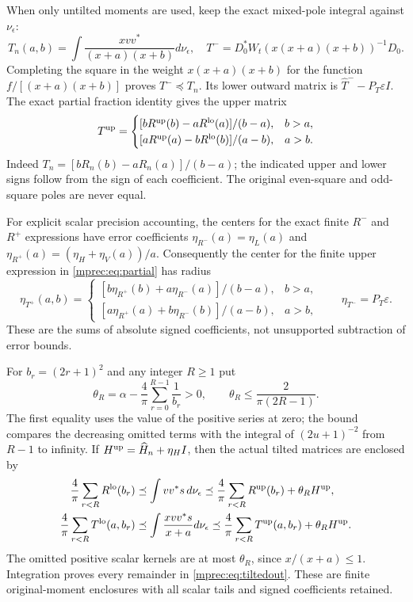 \documentclass[11pt]{article}
\begin{document}
When only untilted moments are used, keep the exact mixed-pole
integral against $\nu_\epsilon$:
\[
 T_n(a,b)=\int\frac{xvv^*}{(x+a)(x+b)}d\nu_\epsilon,
 \quad T^- =D_0^*W_t(x(x+a)(x+b))^{-1}D_0.
\]
Completing the square in the weight $x(x+a)(x+b)$ for the
function $f/[(x+a)(x+b)]$ proves $T^-\preceq T_n$.
Its lower outward matrix is $\widehat T^--P_T\varepsilon I$.
The exact partial fraction identity gives the upper matrix
\begin{equation}\label{mprec:eq:partial}
 T^{\rm up}=
 \begin{cases}
 [bR^{\rm up}(b)-aR^{\rm lo}(a)]/(b-a),&b>a,\\
 [aR^{\rm up}(a)-bR^{\rm lo}(b)]/(a-b),&a>b.
 \end{cases}
\end{equation}
Indeed $T_n=[bR_n(b)-aR_n(a)]/(b-a)$; the indicated upper
and lower signs follow from the sign of each coefficient. The
original even-square and odd-square poles are never equal.

For explicit scalar precision accounting, the centers for the
exact finite $R^-$ and $R^+$ expressions have error coefficients
$\eta_{R^-}(a)=\eta_L(a)$ and
$\eta_{R^+}(a)=(\eta_H+\eta_V(a))/a$. Consequently the
center for the finite upper expression in \eqref{mprec:eq:partial}
has radius
\[
 \eta_{T^+}(a,b)=
 \begin{cases}
 [b\eta_{R^+}(b)+a\eta_{R^-}(a)]/(b-a),&b>a,\\
 [a\eta_{R^+}(a)+b\eta_{R^-}(b)]/(a-b),&a>b,
 \end{cases}
 \qquad \eta_{T^-}=P_T\varepsilon.
\]
These are the sums of absolute signed coefficients, not
unsupported subtraction of error bounds.

For $b_r=(2r+1)^2$ and any integer $R\ge1$ put
\[
 \theta_R=\alpha-\frac4\pi\sum_{r=0}^{R-1}\frac1{b_r}>0,
 \qquad\theta_R\le\frac2{\pi(2R-1)}.
\]
The first equality uses the value of the positive series at zero;
the bound compares the decreasing omitted terms with the integral
of $(2u+1)^{-2}$ from $R-1$ to infinity. If
$H^{\rm up}=\widehat H_n+\eta_HI$, then the actual tilted
matrices are enclosed by
\begin{equation}\label{mprec:eq:tiltedout}
 \begin{aligned}
 \frac4\pi\sum_{r<R}R^{\rm lo}(b_r)
 &\preceq \int vv^*s\,d\nu_\epsilon
 \preceq\frac4\pi\sum_{r<R}R^{\rm up}(b_r)+\theta_RH^{\rm up},\\
 \frac4\pi\sum_{r<R}T^{\rm lo}(a,b_r)
 &\preceq \int\frac{xvv^*s}{x+a}d\nu_\epsilon
 \preceq\frac4\pi\sum_{r<R}T^{\rm up}(a,b_r)+\theta_RH^{\rm up}.
 \end{aligned}
\end{equation}
The omitted positive scalar kernels are at most $\theta_R$,
since $x/(x+a)\le1$. Integration proves every remainder in
\eqref{mprec:eq:tiltedout}. These are finite original-moment enclosures
with all scalar tails and signed coefficients retained.
\end{document}
